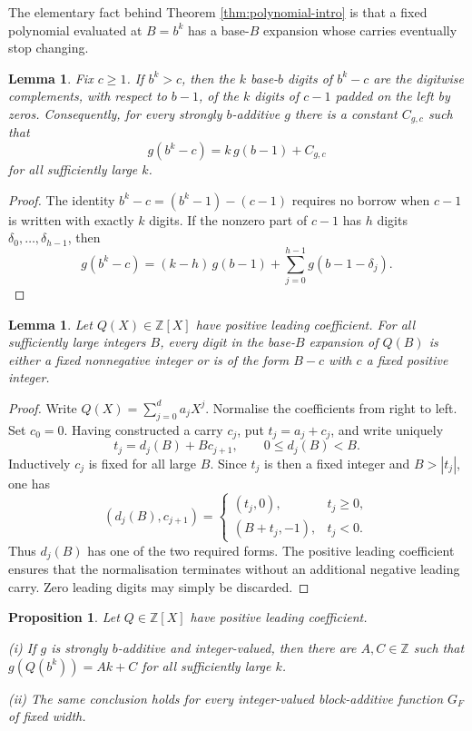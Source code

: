 \documentclass[11pt,reqno]{amsart}
\theoremstyle{plain}
\newtheorem{lemma}[theorem]{Lemma}
\newtheorem{proposition}[theorem]{Proposition}
\theoremstyle{definition}
\newcommand{\Z}{\mathbb{Z}}
\newcommand{\1}{\mathbf 1}
\begin{document}
The elementary fact behind Theorem \ref{thm:polynomial-intro} is that a fixed polynomial evaluated at $B=b^k$ has a base-$B$ expansion whose carries eventually stop changing.

\begin{lemma}\label{lem:complement}
Fix $c\ge1$.  If $b^k>c$, then the $k$ base-$b$ digits of $b^k-c$ are the digitwise complements, with respect to $b-1$, of the $k$ digits of $c-1$ padded on the left by zeros.  Consequently, for every strongly $b$-additive $g$ there is a constant $C_{g,c}$ such that
\[
 g(b^k-c)=k\, g(b-1)+C_{g,c}
\]
for all sufficiently large $k$.
\end{lemma}

\begin{proof}
The identity
$b^k-c=(b^k-1)-(c-1)$
requires no borrow when $c-1$ is written with exactly $k$ digits.  If the nonzero part of $c-1$ has $h$ digits $\delta_0,\ldots,\delta_{h-1}$, then
\[
 g(b^k-c)=(k-h)\,g(b-1)+\sum_{j=0}^{h-1}g(b-1-\delta_j).
\]
\end{proof}

\begin{lemma}\label{lem:carry}
Let $Q(X)\in\Z[X]$ have positive leading coefficient.  For all sufficiently large integers $B$, every digit in the base-$B$ expansion of $Q(B)$ is either a fixed nonnegative integer or is of the form $B-c$ with $c$ a fixed positive integer.
\end{lemma}

\begin{proof}
Write $Q(X)=\sum_{j=0}^d a_jX^j$.  Normalise the coefficients from right to left.  Set $c_0=0$.  Having constructed a carry $c_j$, put
$t_j=a_j+c_j$,
and write uniquely
\[
 t_j=d_j(B)+Bc_{j+1},\qquad 0\le d_j(B)<B.
\]
Inductively $c_j$ is fixed for all large $B$.  Since $t_j$ is then a fixed integer and $B>|t_j|$, one has
\[
 (d_j(B),c_{j+1})=
 \begin{cases}
 (t_j,0),&t_j\ge0,\\
 (B+t_j,-1),&t_j<0.
 \end{cases}
\]
Thus $d_j(B)$ has one of the two required forms.  The positive leading coefficient ensures that the normalisation terminates without an additional negative leading carry.  Zero leading digits may simply be discarded.
\end{proof}

\begin{proposition}\label{prop:affine}
Let $Q\in\Z[X]$ have positive leading coefficient.

\smallskip
\noindent
(i) If $g$ is strongly $b$-additive and integer-valued, then there are $A,C\in\Z$ such that
$g(Q(b^k))=Ak+C$
for all sufficiently large $k$.

\smallskip
\noindent
(ii) The same conclusion holds for every integer-valued block-additive function $G_F$ of fixed width.
\end{proposition}
\end{document}
